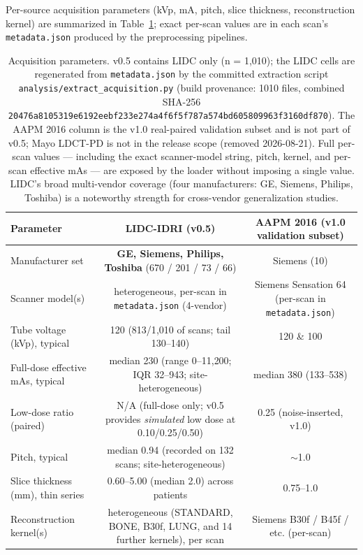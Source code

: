 \documentclass[twoside,11pt]{article}
\begin{document}
Per-source acquisition parameters (kVp, mA, pitch, slice thickness, reconstruction kernel) are summarized in Table~\ref{tab:acquisition_v05}; exact per-scan values are in each scan's \texttt{metadata.json} produced by the preprocessing pipelines.

\begin{table}[ht]
    \centering
    \small
    \setlength{\tabcolsep}{4pt}
    \begin{tabular}{lcc}
        \toprule
        \textbf{Parameter} & \textbf{LIDC-IDRI (v0.5)} & \textbf{AAPM 2016 (v1.0 validation subset)} \\
        \midrule
        Manufacturer set                          & \textbf{GE, Siemens, Philips, Toshiba} (670 / 201 / 73 / 66) & Siemens (10) \\
        Scanner model(s)                          & heterogeneous, per-scan in \texttt{metadata.json} (4-vendor) & Siemens Sensation 64 (per-scan in \texttt{metadata.json}) \\
        Tube voltage (kVp), typical               & 120 (813/1{,}010 of scans; tail 130--140) & 120 \& 100 \\
        Full-dose effective mAs, typical          & median 230 (range 0--11{,}200; IQR 32--943; site-heterogeneous) & median 380 (133--538) \\
        Low-dose ratio (paired)                   & N/A (full-dose only; v0.5 provides \emph{simulated} low dose at 0.10/0.25/0.50) & 0.25 (noise-inserted, v1.0) \\
        Pitch, typical                            & median 0.94 (recorded on 132 scans; site-heterogeneous) & $\sim$1.0 \\
        Slice thickness (mm), thin series         & 0.60--5.00 (median 2.0) across patients & 0.75--1.0 \\
        Reconstruction kernel(s)                  & heterogeneous (STANDARD, BONE, B30f, LUNG, and 14 further kernels), per scan & Siemens B30f / B45f / etc. (per-scan) \\
        \bottomrule
    \end{tabular}
    \caption{Acquisition parameters. v0.5 contains LIDC only (n = 1{,}010); the LIDC cells are regenerated from \texttt{metadata.json} by the committed extraction script \texttt{analysis/extract\_acquisition.py} (build provenance: 1010 files, combined SHA-256 \texttt{20476a8105319e6192eebf233e274a4f6f5f787a574bd605809963f3160df870}). The AAPM 2016 column is the v1.0 real-paired validation subset and is not part of v0.5; Mayo LDCT-PD is not in the release scope (removed 2026-08-21). Full per-scan values --- including the exact scanner-model string, pitch, kernel, and per-scan effective mAs --- are exposed by the loader without imposing a single value. LIDC's broad multi-vendor coverage (four manufacturers: GE, Siemens, Philips, Toshiba) is a noteworthy strength for cross-vendor generalization studies.}
    \label{tab:acquisition_v05}
\end{table}
\end{document}
